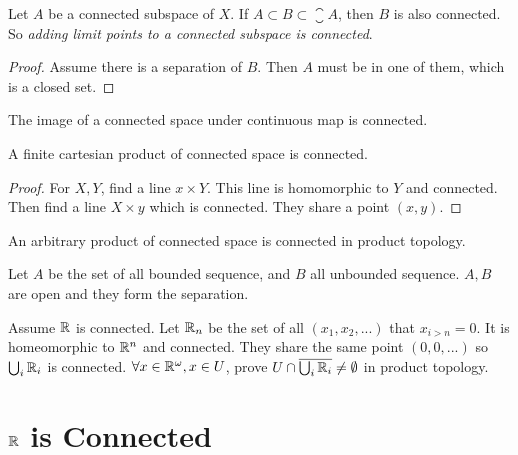 \begin{theorem}
Let $A$ be a connected subspace of $X$. If $A \subset B \subset \closure{A}$, then $B$ is also connected. So \emph{adding limit points to a connected subspace is connected}.
\end{theorem}
\begin{proof}
    Assume there is a separation of $B$. Then $A$ must be in one of them, which is a closed set.
\end{proof}

\begin{theorem}
The image of a connected space under continuous map is connected.    
\end{theorem}

\begin{theorem}
A finite cartesian product of connected space is connected.
\end{theorem}
\begin{proof}
For $X,Y$, find a line $x \times Y$. This line is homomorphic to $Y$ and connected. Then find a line $X \times y$ which is connected. They share a point $(x,y)$.
\end{proof}

\begin{theorem}
    An arbitrary product of connected space is connected in product topology.    
\end{theorem}


\begin{example}
    Let $A$ be the set of all bounded sequence, and $B$ all unbounded sequence. $A,B$ are open and they form the separation.
\end{example}

\begin{example}
    Assume $\mathbb{R}$ is connected. Let $\mathbb{R}_n$ be the set of all $(x_1, x_2, ...)$ that $x_{i > n} = 0$. It is homeomorphic to $\mathbb{R}^n$ and connected. They share the same point $(0,0,...)$ so $\bigcup_i \mathbb{R}_i$ is connected. $\forall x \in \mathbb{R}^\omega, x \in U$, prove $U \cap \overline{\bigcup_i \mathbb{R}_i} \neq \emptyset$ in product topology.
\end{example}


\section{$\mathbb{R}$ is Connected}

